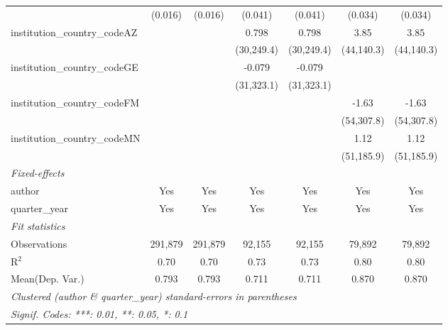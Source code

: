 \begin{tabular}{lcccccc}
                                         & (0.016)        & (0.016)        & (0.041)        & (0.041)        & (0.034)        & (0.034)\\   
   institution\_country\_codeAZ          &                &                & 0.798          & 0.798          & 3.85           & 3.85\\   
                                         &                &                & (30,249.4)     & (30,249.4)     & (44,140.3)     & (44,140.3)\\   
   institution\_country\_codeGE          &                &                & -0.079         & -0.079         &                &   \\   
                                         &                &                & (31,323.1)     & (31,323.1)     &                &   \\   
   institution\_country\_codeFM          &                &                &                &                & -1.63          & -1.63\\   
                                         &                &                &                &                & (54,307.8)     & (54,307.8)\\   
   institution\_country\_codeMN          &                &                &                &                & 1.12           & 1.12\\   
                                         &                &                &                &                & (51,185.9)     & (51,185.9)\\   
   \midrule
   \emph{Fixed-effects}\\
   author                                & Yes            & Yes            & Yes            & Yes            & Yes            & Yes\\  
   quarter\_year                         & Yes            & Yes            & Yes            & Yes            & Yes            & Yes\\  
   \midrule
   \emph{Fit statistics}\\
   Observations                          & 291,879        & 291,879        & 92,155         & 92,155         & 79,892         & 79,892\\  
   R$^2$                                 & 0.70           & 0.70           & 0.73           & 0.73           & 0.80           & 0.80\\  
Mean(Dep. Var.) & 0.793 & 0.793 & 0.711 & 0.711 & 0.870 & 0.870 \\
   \midrule \midrule
   \multicolumn{7}{l}{\emph{Clustered (author \& quarter\_year) standard-errors in parentheses}}\\
   \multicolumn{7}{l}{\emph{Signif. Codes: ***: 0.01, **: 0.05, *: 0.1}}\\
\end{tabular}
\par\endgroup
